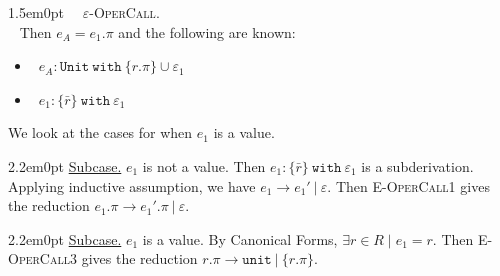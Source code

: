 \documentclass{llncs}
\newcommand{\keywadj}[1]{\mathtt{#1}}
\newcommand{\keyw}[1]{\keywadj{#1}~}
\newcommand{\proofcase}[2]{
	\begin{adjustwidth}{1.5em}{0pt}
		\fbox{Case.}~~#1. \\ ~#2
	\end{adjustwidth}
}
\newcommand{\subcase}[1] {
	\begin{adjustwidth}{2.2em}{0pt}
		\underline{Subcase.} #1
	\end{adjustwidth}
}
\begin{document}
{{	}
	
	\proofcase{\textsc{$\varepsilon$-OperCall}} {
Then $e_A = e_1.\pi$ and the following are known:
\begin{itemize}
	\item~$e_A : \keyw{Unit~with} \{ r.\pi \} \cup \varepsilon_1$
	\item~$e_1 : \{ \bar r \}~\keyw{with} \varepsilon_1$
\end{itemize}
We look at the cases for when $e_1$ is a value.
	
		\subcase { $e_1$ is not a value. Then $e_1 : \{ \bar r \}~\keyw{with} \varepsilon_1$ is a subderivation. Applying inductive assumption, we have $e_1 \longrightarrow e_1'~|~\varepsilon$. Then \textsc{E-OperCall1} gives the reduction $e_1.\pi \longrightarrow e_1'.\pi~|~\varepsilon$.
		}
		
		\subcase { $e_1$ is a value. By Canonical Forms, $\exists r \in R \mid e_1 = r$. Then \textsc{E-OperCall3} gives the reduction $r.\pi \longrightarrow \keywadj{unit}~|~\{ r.\pi \}$.}
		
	}
}
\end{document}
